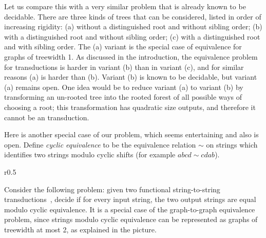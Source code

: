     Let us compare this 
    with a very similar problem that is already known to be decidable. There are three kinds of trees that can be considered, listed in order of increasing rigidity: (a) without a distinguished root and without sibling order; (b)  with a distinguished root and without sibling order; (c) with a distinguished root and with sibling order. The (a) variant is the special case of equivalence for graphs of treewidth 1.  As discussed in the introduction, the equivalence problem for \mso transductions is harder in  variant (b) than in variant (c), and for similar reasons (a) is harder than (b). Variant (b) is known to be decidable, but variant (a) remains open.  One idea would be to reduce variant (a) to variant (b) by transforming an  un-rooted tree into the rooted forest of all possible ways of choosing a root; this transformation has quadratic size outputs, and therefore it cannot be an \mso transduction.
    

     Here is another special case of our problem, which seems entertaining and also is open.
        Define \emph{cyclic equivalence} to be the equivalence relation $\sim$ on strings which identifies two strings modulo cyclic shifts (for example $abcd \sim cdab$).
         \begin{wrapfigure}{r}{0.5\textwidth}
         \end{wrapfigure}
         Consider the following  problem: given two functional string-to-string \mso transductions~\cite[Definition 1]{engelfrietMSODefinableString2001},
        decide if for every input string, the two output strings are equal  modulo cyclic equivalence. %
         It is a special case of the graph-to-graph equivalence problem, since  strings modulo cyclic equivalence  can be represented as graphs of treewidth at most 2, as explained in the  picture.


        